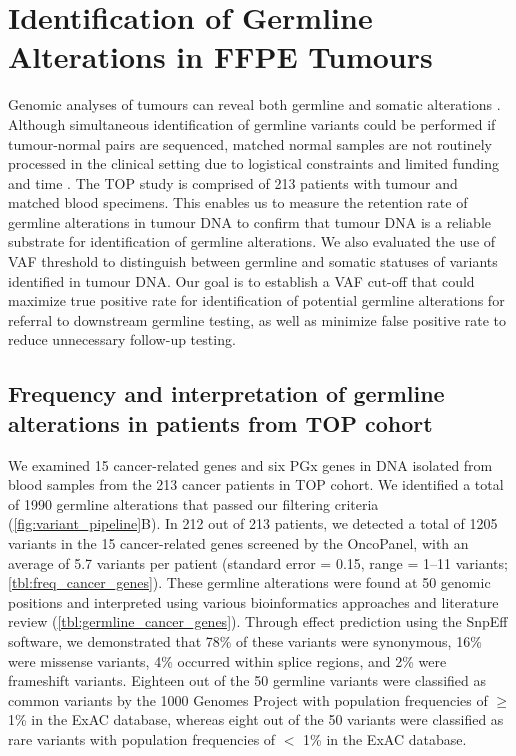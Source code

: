 
\chapter{Identification of Germline Alterations in FFPE Tumours}
\label{ch:IdentificationofGermlineAlterationsinFFPETumours}

Genomic analyses of tumours can reveal both germline and somatic alterations \cite{Schrader2015, Jones2015a, Meric-Bernstam2016, Bombard2014, WcWhinney2009}. Although simultaneous identification of germline variants could be performed if tumour-normal pairs are sequenced, matched normal samples are not routinely processed in the clinical setting due to logistical constraints and limited funding and time \cite{Frampton2013, Fumagalli2010, Lin2014, Wong2014a}. The TOP study is comprised of 213 patients with tumour and matched blood specimens. This enables us to measure the retention rate of germline alterations in tumour DNA to confirm that tumour DNA is a reliable substrate for identification of germline alterations. We also evaluated the use of VAF threshold to distinguish between germline and somatic statuses of variants identified in tumour DNA. Our goal is to establish a VAF cut-off that could maximize true positive rate for identification of potential germline alterations for referral to downstream germline testing, as well as minimize false positive rate to reduce unnecessary follow-up testing.

\section{Frequency and interpretation of germline alterations in patients from TOP cohort}
\label{sec:FrequencyandinterpretationofgermlinealterationsinpatientsfromTOPcohort}

We examined 15 cancer-related genes and six PGx genes in DNA isolated from blood samples from the 213 cancer patients in TOP cohort. We identified a total of 1990 germline alterations that passed our filtering criteria (\autoref{fig:variant_pipeline}B). In 212 out of 213 patients, we detected a total of 1205 variants in the 15 cancer-related genes screened by the OncoPanel, with an average of 5.7 variants per patient (standard error = 0.15, range = 1--11 variants; \autoref{tbl:freq_cancer_genes}). These germline alterations were found at 50 genomic positions and interpreted using various bioinformatics approaches and literature review (\autoref{tbl:germline_cancer_genes}). Through effect prediction using the SnpEff software, we demonstrated that 78\% of these variants were synonymous, 16\% were missense variants, 4\% occurred within splice regions, and 2\% were frameshift variants. Eighteen out of the 50 germline variants were classified as common variants by the 1000 Genomes Project with population frequencies of $\geq$ 1\% in the ExAC database, whereas eight out of the 50 variants were classified as rare variants with population frequencies of $<$ 1\% in the ExAC database.

